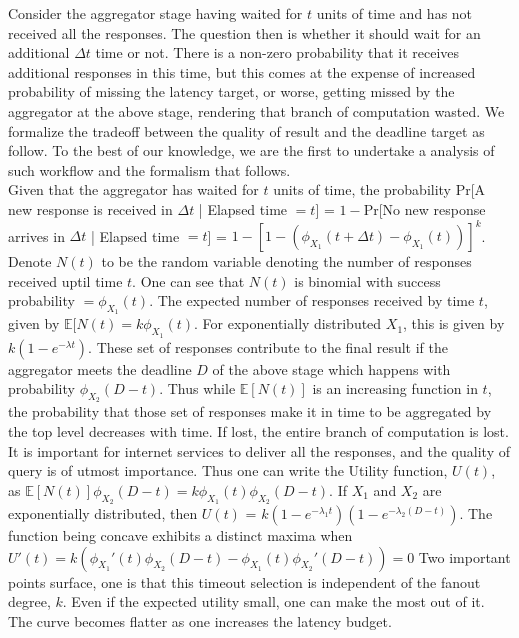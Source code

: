 \documentclass[letterpaper,twocolumn,10pt]{article}
\begin{document}
Consider the aggregator stage having waited for $t$ units of time and has not received all the responses.
The question then is whether it should wait for an additional $\Delta t$ time or not. 
There is a non-zero probability that it receives additional responses in this time, but this comes at the expense of increased probability of missing the latency target, or worse, getting missed by the aggregator at the above stage, rendering that branch of computation wasted.
We formalize the tradeoff between the quality of result and the deadline target as follow. 
To the best of our knowledge, we are the first to undertake a analysis of such workflow and the formalism that follows. \\
Given that the aggregator has waited for $t$ units of time, the probability \textsf{Pr}[A new response is received in $\Delta t$ | Elapsed time $= t$] = $1 - $\textsf{Pr}[No new response arrives in $\Delta t$ | Elapsed time $= t$] = $1 - \left[1 - (\phi_{X_1}(t + \Delta t) - \phi_{X_1}(t)) \right] ^k$. 
Denote $N(t)$ to be the random variable denoting the number of responses received uptil time $t$. 
One can see that $N(t)$ is binomial with success probability $ = \phi_{X_1}(t)$. 
The expected number of responses received by time $t$, given by $\mathbb{E}[N(t) = k\phi_{X_1}(t)$.
For exponentially distributed $X_1$, this is given by $k(1 - e^{-\lambda t})$. 
These set of responses contribute to the final result if the aggregator meets the deadline $D$ of the above stage which happens with probability $\phi_{X_2}(D - t)$. 
Thus while $\mathbb{E}[N(t)]$ is an increasing function in $t$, the probability that those set of responses make it in time to be aggregated by the top level decreases with time.
If lost, the entire branch of computation is lost. It is important for internet services to deliver all the responses, and the quality of query is of utmost importance. 
Thus one can write the Utility function, $U(t)$, as $\mathbb{E}[N(t)]\phi_{X_2}(D - t) = k\phi_{X_1}(t)\phi_{X_2}(D - t)$. 
If $X_1$ and $X_2$ are exponentially distributed, then $U(t)$ = $k(1 - e^{-\lambda_1 t})(1 - e^{-\lambda_2(D - t)})$.
The function being concave exhibits a distinct maxima when $U'(t) = k\left(\phi_{X_1}'(t)\phi_{X_2}(D - t) - \phi_{X_1}(t)\phi_{X_2}'(D - t)\right) = 0$
Two important points surface, one is that this timeout selection is independent of the fanout degree, $k$. 
Even if the expected utility small, one can make the most out of it.
The curve becomes flatter as one increases the latency budget.
\end{document}
